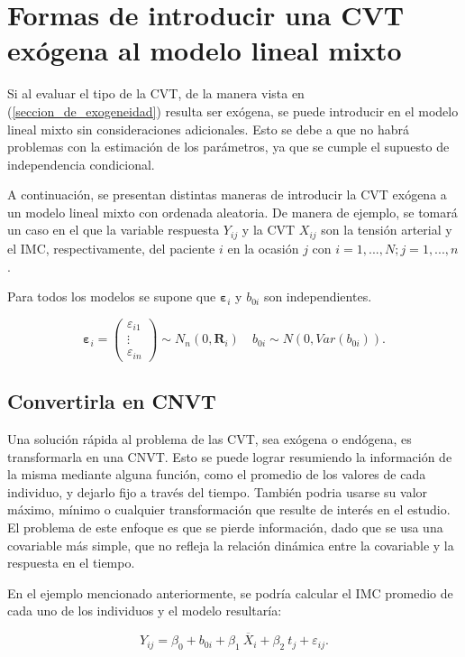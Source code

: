 \documentclass[spanish]{article}
\numberwithin{figure}{subsection}
\numberwithin{equation}{subsection}
\numberwithin{table}{subsection}
\begin{document}
\newpage

\section{Formas de introducir una CVT exógena al modelo lineal mixto}

Si al evaluar el tipo de la CVT, de la manera vista en
(\ref{seccion_de_exogeneidad}) resulta ser exógena, se puede introducir en el
modelo lineal mixto sin consideraciones adicionales. Esto se debe a que no habrá
problemas con la estimación de los parámetros, ya que se cumple el supuesto de
independencia condicional.

A continuación, se presentan distintas maneras de introducir la CVT exógena a un
modelo lineal mixto con ordenada aleatoria. De manera de ejemplo, se tomará un
caso en el que la variable respuesta $Y_{ij}$ y la CVT $X_{ij}$ son la tensión
arterial y el IMC, respectivamente, del paciente $i$ en la ocasión $j$ con
$i = 1, ..., N; j = 1, ..., n$.

Para todos los modelos se supone que $\bm{\varepsilon}_i$ y $b_{0i}$ son
independientes.

\[ 
	\bm{\varepsilon}_i = \begin{pmatrix} \varepsilon_{i1} \\ \vdots \\ \varepsilon_{in} \end{pmatrix} \sim N_{n}(0, \bm{R}_i)
	\quad
	b_{0i} \sim N(0, Var(b_{0i})).
\]

\subsection{Convertirla en CNVT}

Una solución rápida al problema de las CVT, sea exógena o endógena, es
transformarla en una CNVT. Esto se puede lograr resumiendo la información de la
misma mediante alguna función, como el promedio de los valores de cada
individuo, y dejarlo fijo a través del tiempo. También podria usarse su valor
máximo, mínimo o cualquier transformación que resulte de interés en el estudio.
El problema de este enfoque es que se pierde información, dado que se usa una
covariable más simple, que no refleja la relación dinámica entre la covariable y
la respuesta en el tiempo.

En el ejemplo mencionado anteriormente, se podría calcular el IMC promedio de
cada uno de los individuos y el modelo resultaría:

\[ Y_{ij} = \beta_0 + b_{0i} + \beta_1\ \overline{X}_i + \beta_2\ t_j + \varepsilon_{ij}. \]
\end{document}
